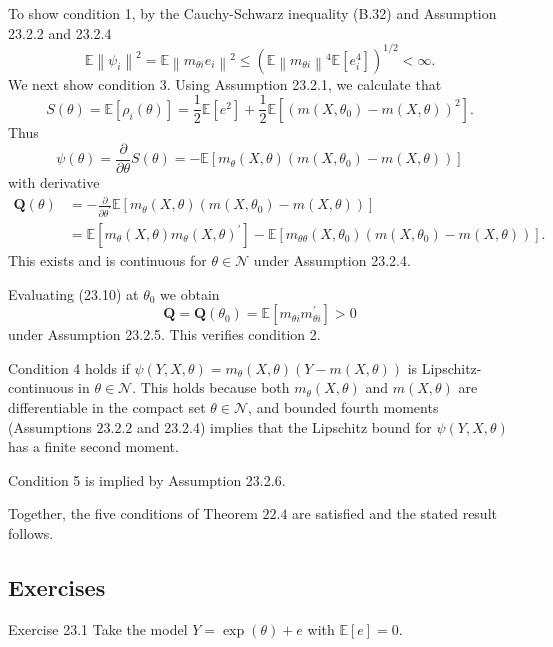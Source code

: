 \documentclass[10pt]{article}
\begin{document}
To show condition 1, by the Cauchy-Schwarz inequality (B.32) and Assumption 23.2.2 and 23.2.4
$$
\mathbb{E}\left\|\psi_{i}\right\|^{2}=\mathbb{E}\left\|m_{\theta i} e_{i}\right\|^{2} \leq\left(\mathbb{E}\left\|m_{\theta i}\right\|^{4} \mathbb{E}\left[e_{i}^{4}\right]\right)^{1 / 2}<\infty .
$$
We next show condition 3. Using Assumption 23.2.1, we calculate that
$$
S(\theta)=\mathbb{E}\left[\rho_{i}(\theta)\right]=\frac{1}{2} \mathbb{E}\left[e^{2}\right]+\frac{1}{2} \mathbb{E}\left[\left(m\left(X, \theta_{0}\right)-m(X, \theta)\right)^{2}\right] .
$$
Thus
$$
\psi(\theta)=\frac{\partial}{\partial \theta} S(\theta)=-\mathbb{E}\left[m_{\theta}(X, \theta)\left(m\left(X, \theta_{0}\right)-m(X, \theta)\right)\right]
$$
with derivative
$$
\begin{aligned}
\boldsymbol{Q}(\theta) &=-\frac{\partial}{\partial \theta^{\prime}} \mathbb{E}\left[m_{\theta}(X, \theta)\left(m\left(X, \theta_{0}\right)-m(X, \theta)\right)\right] \\
&=\mathbb{E}\left[m_{\theta}(X, \theta) m_{\theta}(X, \theta)^{\prime}\right]-\mathbb{E}\left[m_{\theta \theta}\left(X, \theta_{0}\right)\left(m\left(X, \theta_{0}\right)-m(X, \theta)\right)\right] .
\end{aligned}
$$
This exists and is continuous for $\theta \in \mathcal{N}$ under Assumption 23.2.4.

Evaluating (23.10) at $\theta_{0}$ we obtain
$$
\boldsymbol{Q}=\boldsymbol{Q}\left(\theta_{0}\right)=\mathbb{E}\left[m_{\theta i} m_{\theta i}^{\prime}\right]>0
$$
under Assumption 23.2.5. This verifies condition 2.

Condition 4 holds if $\psi(Y, X, \theta)=m_{\theta}(X, \theta)(Y-m(X, \theta))$ is Lipschitz-continuous in $\theta \in \mathscr{N}$. This holds because both $m_{\theta}(X, \theta)$ and $m(X, \theta)$ are differentiable in the compact set $\theta \in \mathscr{N}$, and bounded fourth moments (Assumptions $23.2 .2$ and 23.2.4) implies that the Lipschitz bound for $\psi(Y, X, \theta)$ has a finite second moment.

Condition 5 is implied by Assumption 23.2.6.

Together, the five conditions of Theorem $22.4$ are satisfied and the stated result follows.

\subsection{Exercises}
Exercise 23.1 Take the model $Y=\exp (\theta)+e$ with $\mathbb{E}[e]=0$.
\end{document}

